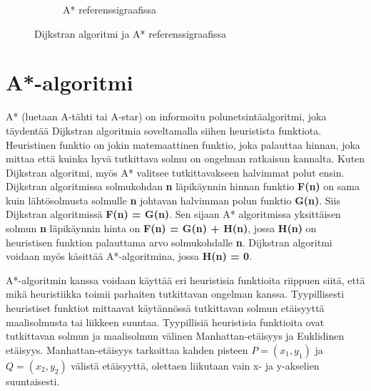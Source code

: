 \begin{figure}
\begin{subfigure}[b]{0.5\textwidth}
		\caption{A* referenssigraafissa}\label{refAStar}
	\end{subfigure}
	\caption{Dijkstran algoritmi ja A* referenssigraafissa}\label{DijkstraAStarFigs}
\end{figure}

\section{A*-algoritmi}\label{aStar}
A* (luetaan A-tähti tai A-star) on informoitu polunetsintäalgoritmi, joka 
täydentää Dijkstran algoritmia soveltamalla siihen heuristista 
funktiota.\cite{MathewAndMalathy} Heuristinen funktio on jokin matemaattinen 
funktio, joka palauttaa hinnan, joka mittaa että kuinka hyvä tutkittava 
solmu on ongelman ratkaisun kannalta. Kuten Dijkstran algoritmi, myös A* 
valitsee tutkittavakseen halvimmat polut ensin.\cite{DelaunayVoronoiAStar} 
Dijkstran algoritmissa solmukohdan \textbf{n} läpikäynnin hinnan funktio 
\textbf{F(n)} on sama kuin lähtösolmusta solmulle \textbf{n} johtavan 
halvimman polun funktio \textbf{G(n)}. Siis Dijkstran algoritmissä 
\textbf{F(n) = G(n)}.\cite{MathewAndMalathy} Sen sijaan A* algoritmissa 
yksittäisen solmun \textbf{n} läpikäynnin hinta on 
\textbf{F(n) = G(n) + H(n)}, jossa \textbf{H(n)} on heuristisen funktion 
palauttama arvo solmukohdalle \textbf{n}.\cite{DelaunayVoronoiAStar} 
Dijkstran algoritmi voidaan myös käsittää A*-algoritmina, jossa 
\textbf{H(n) = 0}.\cite{MathewAndMalathy}\par 
	A*-algoritmin kanssa voidaan käyttää eri heuristisia funktioita 
riippuen siitä, että mikä heuristiikka toimii parhaiten tutkittavan ongelman 
kanssa. Tyypillisesti heuristiset funktiot mittaavat käytännössä tutkittavan 
solmun etäisyyttä maalisolmusta tai liikkeen suuntaa.\cite{ProcediaAStar} 
Tyypillisiä heuristisia funktioita ovat tutkittavan solmun ja maalisolmun 
välinen Manhattan-etäisyys ja Euklidinen etäisyys.\cite{MathewAndMalathy} 
Manhattan-etäisyys tarkoittaa kahden pisteen $P = (x_1,y_1)$ ja 
$Q = (x_2,y_2)$ välistä etäisyyttä, olettaen liikutaan vain x- ja 
y-akselien suuntaisesti.\cite{MathewAndMalathy}

